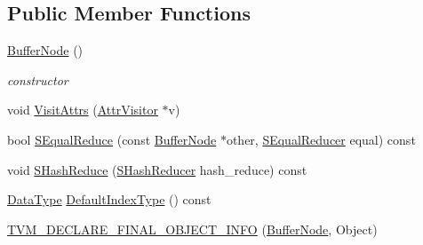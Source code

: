 \subsection*{Public Member Functions}
\begin{DoxyCompactItemize}
\item 
\hyperlink{classtvm_1_1tir_1_1BufferNode_a1abac917e1de0b3c43774ee94477016b}{Buffer\+Node} ()
\begin{DoxyCompactList}\small\item\em constructor \end{DoxyCompactList}\item 
void \hyperlink{classtvm_1_1tir_1_1BufferNode_a7f8d61e038e7aba1dee84c7451f5948d}{Visit\+Attrs} (\hyperlink{classtvm_1_1AttrVisitor}{Attr\+Visitor} $\ast$v)
\item 
bool \hyperlink{classtvm_1_1tir_1_1BufferNode_a9b849acfdc74712f4d2bfd9e631ee398}{S\+Equal\+Reduce} (const \hyperlink{classtvm_1_1tir_1_1BufferNode}{Buffer\+Node} $\ast$other, \hyperlink{classtvm_1_1SEqualReducer}{S\+Equal\+Reducer} equal) const 
\item 
void \hyperlink{classtvm_1_1tir_1_1BufferNode_a34765bcd330d69b8e4c2ca69f4a9a838}{S\+Hash\+Reduce} (\hyperlink{classtvm_1_1SHashReducer}{S\+Hash\+Reducer} hash\+\_\+reduce) const 
\item 
\hyperlink{namespacetvm_a41918af1a1dc386388639a9d3ad06c5d}{Data\+Type} \hyperlink{classtvm_1_1tir_1_1BufferNode_a807f590bb261c7da322ee27f4037d20e}{Default\+Index\+Type} () const 
\item 
\hyperlink{classtvm_1_1tir_1_1BufferNode_a9c4a74fd95cc9cd80f87b3f13bcdb8b3}{T\+V\+M\+\_\+\+D\+E\+C\+L\+A\+R\+E\+\_\+\+F\+I\+N\+A\+L\+\_\+\+O\+B\+J\+E\+C\+T\+\_\+\+I\+N\+FO} (\hyperlink{classtvm_1_1tir_1_1BufferNode}{Buffer\+Node}, Object)
\end{DoxyCompactItemize}

